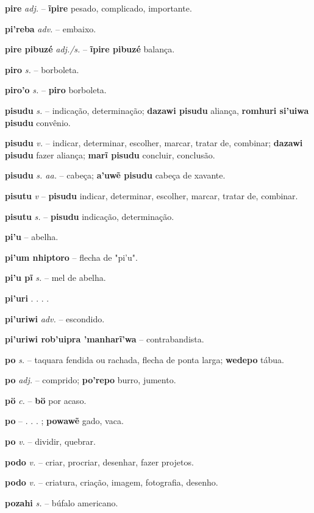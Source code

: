 \textbf{pire} \textit{adj.} -- \textbf{ĩpire} pesado, complicado, importante.

\textbf{pi'reba} \textit{adv.} -- embaixo.

\textbf{pire pibuzé} \textit{adj./s.} -- \textbf{ĩpire pibuzé} balança.

\textbf{piro} \textit{s.} -- borboleta.

\textbf{piro'o} \textit{s.} -- \textbf{piro} borboleta.

\textbf{pisudu} \textit{s.} -- indicação, determinação; \textbf{dazawi pisudu} aliança, \textbf{romhuri si'uiwa pisudu} convênio.

\textbf{pisudu} \textit{v.} -- indicar, determinar, escolher, marcar, tratar de, combinar; \textbf{dazawi pisudu} fazer aliança; \textbf{marĩ pisudu} concluir, conclusão.

\textbf{pisudu} \textit{s. aa.} -- cabeça; \textbf{a'uwẽ pisudu} cabeça de xavante.

\textbf{pisutu} \textit{v} -- \textbf{pisudu} indicar, determinar, escolher, marcar, tratar de, combinar.

\textbf{pisutu} \textit{s.} -- \textbf{pisudu} indicação, determinação.

\textbf{pi'u} -- abelha.

\textbf{pi'um nhiptoro} -- flecha de "pi'u".

\textbf{pi'u pĩ} \textit{s.} -- mel de abelha.

\textbf{pi'uri} . . . .

\textbf{pi'uriwi} \textit{adv.} -- escondido.

\textbf{pi'uriwi rob'uipra 'manharĩ'wa} -- contrabandista.

\textbf{po} \textit{s.} -- taquara fendida ou rachada, flecha de ponta larga; \textbf{wedepo} tábua.

\textbf{po} \textit{adj.} -- comprido; \textbf{po'repo} burro, jumento.

\textbf{pö} \textit{c.} -- \textbf{bö} por acaso.

\textbf{po} -- . . . ; \textbf{powawẽ} gado, vaca.

\textbf{po} \textit{v.} -- dividir, quebrar.

\textbf{podo} \textit{v.} -- criar, procriar, desenhar, fazer projetos.

\textbf{podo} \textit{v.} -- criatura, criação, imagem, fotografia, desenho.

\textbf{pozahi} \textit{s.} -- búfalo americano.

